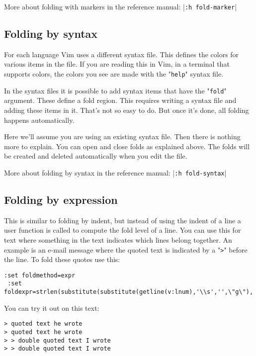More about folding with markers in the reference manual: |\verb!:h fold-marker!|
\subsection{Folding by syntax}
For each language Vim uses a different syntax file.
This defines the colors for various items in the file.
If you are reading this in Vim, in a terminal that supports colors, the colors you see are made with the "\verb!help!" syntax file.

In the syntax files it is possible to add syntax items that have the "\verb!fold!" argument.
These define a fold region.
This requires writing a syntax file and adding these items in it.
That's not so easy to do.
But once it's done, all folding happens automatically.

Here we'll assume you are using an existing syntax file.
Then there is nothing more to explain.
You can open and close folds as explained above.
The folds will be created and deleted automatically when you edit the file.

More about folding by syntax in the reference manual: |\verb!:h fold-syntax!|
\subsection{Folding by expression}
This is similar to folding by indent, but instead of using the indent of a line a user function is called to compute the fold level of a line.
You can use this for text where something in the text indicates which lines belong together.
An example is an e-mail message where the quoted text is indicated by a "\verb!>!" before the line.
To fold these quotes use this:

\begin{Verbatim}[samepage=true]
 :set foldmethod=expr
 :set foldexpr=strlen(substitute(substitute(getline(v:lnum),'\\s','',\"g\"),'[^>].*','',''))
\end{Verbatim}

You can try it out on this text:

\begin{Verbatim}[samepage=true]
> quoted text he wrote
> quoted text he wrote
> > double quoted text I wrote
> > double quoted text I wrote
\end{Verbatim}

